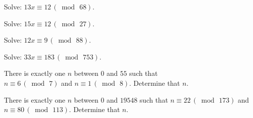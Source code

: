 \begin{prob}
Solve: $13x\equiv 12\,(\bmod\, 68)$.
\end{prob}

\begin{prob}
Solve: $15x\equiv 12\,(\bmod\, 27)$.
\end{prob}

\begin{prob}
Solve: $12x\equiv 9\,(\bmod\, 88)$.
\end{prob}

\begin{prob}
Solve: $33x\equiv 183\,(\bmod\,753 )$.
\end{prob}


\begin{prob}
There is exactly one $n$ between $0$ and $55$ such that \\
$n\equiv 6\,(\bmod\,7)$ and $n\equiv 1\,(\bmod\,8)$. Determine that $n$.
\end{prob}

\begin{prob}
There is exactly one $n$ between $0$ and $19548$ such that $n\equiv 22\,(\bmod\,173)$ and $n\equiv 80\,(\bmod\,113)$. Determine that $n$.
\end{prob}
 
